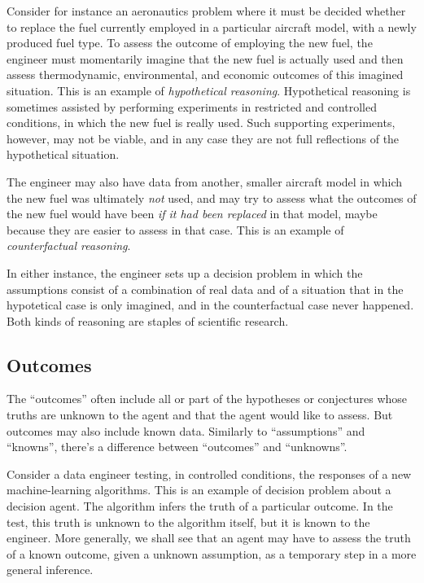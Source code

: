 \documentclass[
  a4paper,
  DIV=11,
  numbers=noendperiod,
  oneside]{scrreprt}
\begin{document}
Consider for instance an aeronautics problem where it must be decided
whether to replace the fuel currently employed in a particular aircraft
model, with a newly produced fuel type. To assess the outcome of
employing the new fuel, the engineer must momentarily imagine that the
new fuel is actually used and then assess thermodynamic, environmental,
and economic outcomes of this imagined situation. This is an example of
\emph{hypothetical reasoning}. Hypothetical reasoning is sometimes
assisted by performing experiments in restricted and controlled
conditions, in which the new fuel is really used. Such supporting
experiments, however, may not be viable, and in any case they are not
full reflections of the hypothetical situation.

The engineer may also have data from another, smaller aircraft model in
which the new fuel was ultimately \emph{not} used, and may try to assess
what the outcomes of the new fuel would have been \emph{if it had been
replaced} in that model, maybe because they are easier to assess in that
case. This is an example of \emph{counterfactual reasoning}.

In either instance, the engineer sets up a decision problem in which the
assumptions consist of a combination of real data and of a situation
that in the hypotetical case is only imagined, and in the counterfactual
case never happened. Both kinds of reasoning are staples of scientific
research.

\hypertarget{outcomes}{%
\subsection{Outcomes}\label{outcomes}}

The ``outcomes'' often include all or part of the hypotheses or
conjectures whose truths are unknown to the agent and that the agent
would like to assess. But outcomes may also include known data.
Similarly to ``assumptions'' and ``knowns'', there's a difference
between ``outcomes'' and ``unknowns''.

Consider a data engineer testing, in controlled conditions, the
responses of a new machine-learning algorithms. This is an example of
decision problem about a decision agent. The algorithm infers the truth
of a particular outcome. In the test, this truth is unknown to the
algorithm itself, but it is known to the engineer. More generally, we
shall see that an agent may have to assess the truth of a known outcome,
given a unknown assumption, as a temporary step in a more general
inference.
\end{document}
